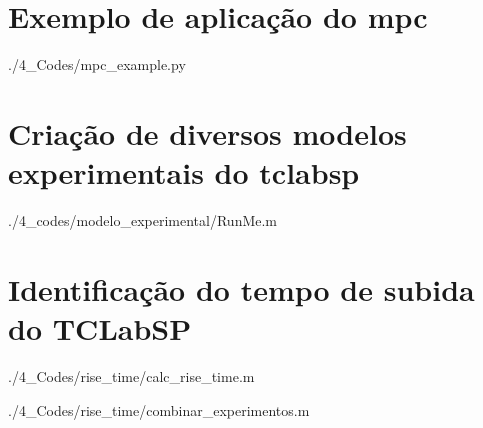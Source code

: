 \begin{apendicesenv}
\section{Exemplo de aplicação do \acrlong{mpc}}


	{./4_Codes/mpc_example.py}
	\begin{center}
	\end{center}

\section{Criação de diversos modelos experimentais do \acrshort{tclabsp}}
\label{sec:tclabsp-models-creation}


	{./4_codes/modelo_experimental/RunMe.m}
	\begin{center}
    \end{center}

\section{Identificação do tempo de subida do TCLabSP}
\label{sec:tclabsp_tempo_de_subida}


	{./4_Codes/rise_time/calc_rise_time.m}
	\begin{center}
	\end{center}


	{./4_Codes/rise_time/combinar_experimentos.m}
	\begin{center}
	\end{center}


\end{apendicesenv}
